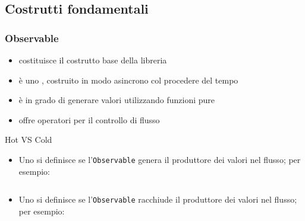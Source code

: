         \subsection{Costrutti fondamentali}\label{subsec:costrutti}

            \subsubsection{Observable}\label{subsub:observable}

            \begin{frame}{\insertsubsectionhead}
                \begin{block}{\texttt{\insertsubsubsectionhead}}
                    \begin{itemize}
                        \item costituisce il costrutto base della libreria
                        \item è uno , costruito in modo asincrono col procedere del tempo
                        \item è in grado di generare valori utilizzando funzioni pure
                        \item offre operatori per il controllo di flusso
                    \end{itemize}
                \end{block}
            \end{frame}

            \begin{frame}{\insertsubsectionhead}{\insertsubsubsectionhead}
                \begin{block}{Hot VS Cold}
                    \begin{itemize}
                        \item
                            Uno  si definisce \textbf{} se l'\texttt{Observable} genera il produttore dei valori nel flusso; per esempio:

                            \inputminted{js}{src/cold_observable.js}

                        \item
                            Uno  si definisce \textbf{} se l'\texttt{Observable} racchiude il produttore dei valori nel flusso; per esempio:

                            \inputminted{js}{src/hot_observable.js}
                    \end{itemize}
                \end{block}
            \end{frame}

